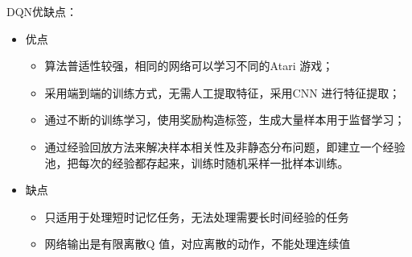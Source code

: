 \begin{note}
    DQN优缺点：
    \begin{itemize}
        \item 优点
        \begin{itemize}
            \item 算法普适性较强，相同的网络可以学习不同的Atari 游戏；
            \item 采用端到端的训练方式，无需人工提取特征，采用CNN 进行特征提取；
            \item 通过不断的训练学习，使用奖励构造标签，生成大量样本用于监督学习；
            \item 通过经验回放方法来解决样本相关性及非静态分布问题，即建立一个经验池，把每次的经验都存起来，训练时随机采样一批样本训练。
        \end{itemize}
        \item 缺点
        \begin{itemize}
            \item 只适用于处理短时记忆任务，无法处理需要长时间经验的任务
            \item 网络输出是有限离散Q 值，对应离散的动作，不能处理连续值
        \end{itemize}
    \end{itemize}
\end{note}